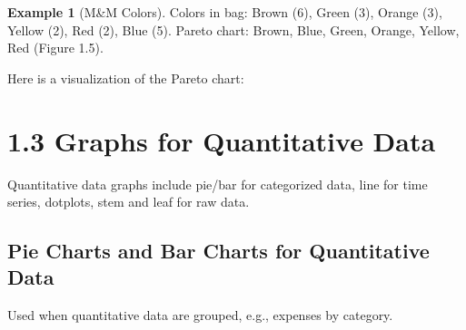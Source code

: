 \documentclass{article}
\theoremstyle{definition}
\newtheorem{example}{Example}
\begin{document}
	\begin{example}[M\&M Colors]
		Colors in bag: Brown (6), Green (3), Orange (3), Yellow (2), Red (2), Blue (5). Pareto chart: Brown, Blue, Green, Orange, Yellow, Red (Figure 1.5).
		
		Here is a visualization of the Pareto chart:
		
	\end{example}
	
	\section{1.3 Graphs for Quantitative Data}
	
	Quantitative data graphs include pie/bar for categorized data, line for time series, dotplots, stem and leaf for raw data.
	
	\subsection{Pie Charts and Bar Charts for Quantitative Data}
	
	Used when quantitative data are grouped, e.g., expenses by category.
	
\end{document}
